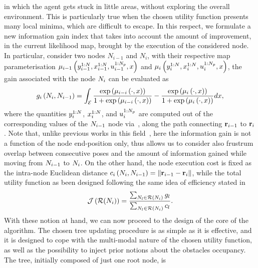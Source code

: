 in which the agent gets stuck in little areas, without exploring the overall environment. This is particularly true when the
chosen utility function presents many local minima, which are difficult to escape.
In this respect, we formulate a new information gain index that takes into account the amount of improvement, in the current
likelihood map, brought by the execution of the considered node. In particular, consider two nodes $N_{i-1}$ and $N_i$,
with their respective map parameterisation $\mu_{i-1} \left( y_{i-1}^{1:N}, x_{i-1}^{1:N}, u_{i-1}^{1:N_p}, x \right)$
and $\mu_{i} \left( y_{i}^{1:N}, x_{i}^{1:N}, u_{i}^{1:N_p}, x \right)$, the gain associated with the
node $N_i$ can be evaluated as
\begin{equation*}
	g_i \left( N_i, N_{i-1} \right) = \int_{\mathcal{E}} \frac{\exp \left( \mu_{i-i} \left( \cdot, x \right) \right)}{1 + \exp \left( \mu_{i-i} \left( \cdot, x \right) \right)} -
								  	   \frac{\exp \left( \mu_i \left( \cdot, x \right) \right)}{1 + \exp \left( \mu_i \left( \cdot, x \right) \right)} dx,
\end{equation*}
where the quantities $y_{i}^{1:N}$, $x_{i}^{1:N}$, and $u_{i}^{1:N_p}$ are computed out of the corresponding
values of the $N_{i-1}$ node via~, along the path connecting $\mathbf{r}_{i-1}$ to $\mathbf{r}_i$.
Note that, unlike previous works in this field~\cite{popovic2020informative, schmid2020efficient}, here the information gain is not
a function of the node end-position only, thus allows us to consider also frustrum overlap between consecutive poses and the amount of
information gained while moving from $N_{i-1}$ to $N_i$.
On the other hand, the node execution cost is fixed as the intra-node Euclidean distance $c_i \left( N_i, N_{i-1} \right) = \left \lVert {\mathbf{r}_{i-1} - \mathbf{r}_i} \right \rVert$,
while the total utility function as been designed following the same idea of efficiency stated in~
\begin{equation*}
	\mathcal{J} \left( \mathcal{R}(N_i) \right) = \frac{\sum_{N_l \in \mathcal{R} \left( N_i \right)} g_l}{\sum_{N_l \in \mathcal{R} \left( N_i \right)} c_l}.
\end{equation*}
With these notion at hand, we can now proceed to the design of the core of the algorithm. The chosen tree updating procedure is
as simple as it is effective, and it is designed to cope with the multi-modal nature of the chosen utility function, as well as
the possibility to inject prior notions about the obstacles occupancy. The tree, initially composed of just one root node, is
